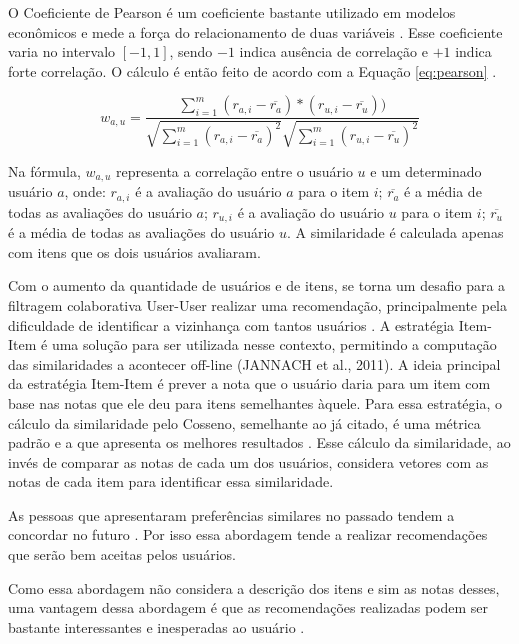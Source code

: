 O Coeficiente de Pearson é um coeficiente bastante utilizado em modelos econômicos e mede a força do relacionamento
de duas variáveis \cite{torres2004personalizaccao}. Esse coeficiente varia no intervalo $[-1, 1]$, sendo $-1$ indica
ausência de correlação e $+1$ indica forte correlação. O cálculo é então feito de acordo com a Equação \ref{eq:pearson}
\cite{torres2004personalizaccao}.

\begin{equation}
  w_{a,u} = \frac{\sum_{i=1}^{m}(r_{a,i} - \overline{r_a})*(r_{u,i} - \overline{r_u}))}{\sqrt{\sum_{i=1}^{m}(r_{a,i} - \overline{r_a})^2} \sqrt{\sum_{i=1}^{m}(r_{u,i} - \overline{r_u})^2}}
  \label{eq:pearson}
\end{equation}

Na fórmula, $w_{a,u}$ representa a correlação entre o usuário $u$ e um determinado usuário $a$, onde: $r_{a,i}$ é a avaliação
do usuário $a$ para o item $i$; $\overline{r_a}$ é a média de todas as avaliações do usuário $a$; $r_{u,i}$ é a avaliação do usuário
$u$ para o item $i$; $\overline{r_u}$ é a média de todas as avaliações do usuário $u$. A similaridade é calculada apenas com
itens que os dois usuários avaliaram.

Com o aumento da quantidade de usuários e de itens, se torna um desafio para a filtragem colaborativa User-User
realizar uma recomendação, principalmente pela dificuldade de identificar a vizinhança com tantos usuários
\cite{jannach2010recommender}. A estratégia Item-Item é uma solução para ser utilizada nesse contexto, permitindo a
computação das similaridades a acontecer off-line (JANNACH et al., 2011). A ideia principal da estratégia Item-Item
é prever a nota que o usuário daria para um item com base nas notas que ele deu para itens semelhantes àquele. Para
essa estratégia, o cálculo da similaridade pelo Cosseno, semelhante ao já citado, é uma métrica padrão e a que
apresenta os melhores resultados \cite{jannach2010recommender}. Esse cálculo da similaridade, ao invés de comparar
as notas de cada um dos usuários, considera vetores com as notas de cada item para identificar essa similaridade.

As pessoas que apresentaram preferências similares no passado tendem a concordar no futuro \cite{ricci2011introduction}.
Por isso essa abordagem tende a realizar recomendações que serão bem aceitas pelos usuários.

Como essa abordagem não considera a descrição dos itens e sim as notas desses, uma vantagem dessa abordagem é que as
recomendações realizadas podem ser bastante interessantes e inesperadas ao usuário \cite{ricci2011introduction}.

